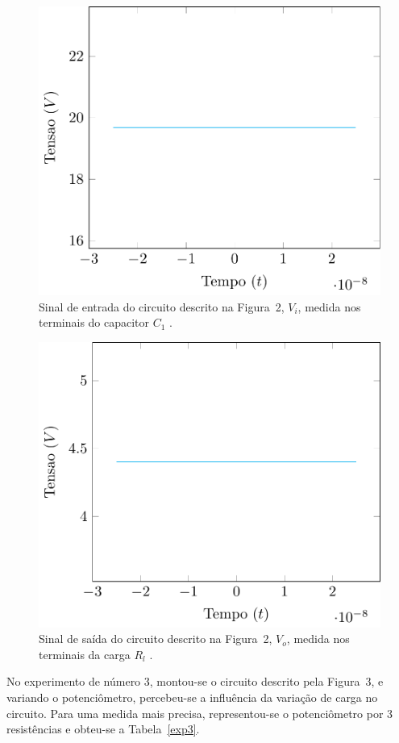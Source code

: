 \documentclass[12pt,a4paper]{article}
\begin{document}
\begin{figure}[htpb]
  \centering
  \includegraphics[width=0.8\linewidth]{./exp2/entrada_exp2.pdf}
  \caption{Sinal de entrada do circuito descrito na Figura~2, $V_{i}$, medida nos terminais do capacitor $C_1$ .}
  \label{entrada_exp2}
\end{figure}
\begin{figure}[htpb]
  \centering
  \includegraphics[width=0.8\linewidth]{./exp2/saida_exp2.pdf}
  \caption{Sinal de saída do circuito descrito na Figura~2, $V_{o}$, medida nos terminais da carga $R_l$ .}
  \label{saida_exp2}
\end{figure}

No experimento de número 3, montou-se o circuito descrito pela Figura~3, e variando o potenciômetro, percebeu-se a influência da variação de carga no circuito. Para uma medida mais precisa, representou-se o potenciômetro por 3 resistências e obteu-se a Tabela~\ref{exp3}.
\end{document}
